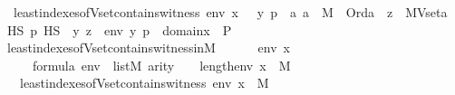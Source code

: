 \begin{isabellebody}
\ \ {\isachardoublequoteopen}least{\isacharunderscore}{\kern0pt}indexes{\isacharunderscore}{\kern0pt}of{\isacharunderscore}{\kern0pt}Vset{\isacharunderscore}{\kern0pt}contains{\isacharunderscore}{\kern0pt}witness{\isacharparenleft}{\kern0pt}{\isasymphi}{\isacharcomma}{\kern0pt}\ env{\isacharcomma}{\kern0pt}\ x{\isacharparenright}{\kern0pt}\ {\isasymequiv}\ {\isacharbraceleft}{\kern0pt}\ {\isacharless}{\kern0pt}{\isacharless}{\kern0pt}y{\isacharcomma}{\kern0pt}\ p{\isachargreater}{\kern0pt}{\isacharcomma}{\kern0pt}\ {\isacharparenleft}{\kern0pt}{\isasymmu}\ a{\isachardot}{\kern0pt}\ a\ {\isasymin}\ M\ {\isasymand}\ Ord{\isacharparenleft}{\kern0pt}a{\isacharparenright}{\kern0pt}\ {\isasymand}\ {\isacharparenleft}{\kern0pt}{\isasymexists}z\ {\isasymin}\ MVset{\isacharparenleft}{\kern0pt}a{\isacharparenright}{\kern0pt}\ {\isasyminter}\ HS{\isachardot}{\kern0pt}\ p\ {\isasymtturnstile}HS\ {\isasymphi}\ {\isacharparenleft}{\kern0pt}{\isacharbrackleft}{\kern0pt}y{\isacharcomma}{\kern0pt}\ z{\isacharbrackright}{\kern0pt}\ {\isacharat}{\kern0pt}\ env{\isacharparenright}{\kern0pt}{\isacharparenright}{\kern0pt}{\isacharparenright}{\kern0pt}{\isachargreater}{\kern0pt}{\isachardot}{\kern0pt}\ {\isacharless}{\kern0pt}y{\isacharcomma}{\kern0pt}\ p{\isachargreater}{\kern0pt}\ {\isasymin}\ domain{\isacharparenleft}{\kern0pt}x{\isacharparenright}{\kern0pt}\ {\isasymtimes}\ P\ {\isacharbraceright}{\kern0pt}{\isachardoublequoteclose}\isanewline
\isanewline
{}\isamarkupfalse%
\ least{\isacharunderscore}{\kern0pt}indexes{\isacharunderscore}{\kern0pt}of{\isacharunderscore}{\kern0pt}Vset{\isacharunderscore}{\kern0pt}contains{\isacharunderscore}{\kern0pt}witness{\isacharunderscore}{\kern0pt}in{\isacharunderscore}{\kern0pt}M\ {\isacharcolon}{\kern0pt}\ \isanewline
\ \ \ {\isasymphi}\ env\ x\ \isanewline
\ \ \ {\isachardoublequoteopen}{\isasymphi}\ {\isasymin}\ formula{\isachardoublequoteclose}\ {\isachardoublequoteopen}env\ {\isasymin}\ list{\isacharparenleft}{\kern0pt}M{\isacharparenright}{\kern0pt}{\isachardoublequoteclose}\ {\isachardoublequoteopen}arity{\isacharparenleft}{\kern0pt}{\isasymphi}{\isacharparenright}{\kern0pt}\ {\isasymle}\ {}\ {\isacharhash}{\kern0pt}{\isacharplus}{\kern0pt}\ length{\isacharparenleft}{\kern0pt}env{\isacharparenright}{\kern0pt}{\isachardoublequoteclose}\ {\isachardoublequoteopen}x\ {\isasymin}\ M{\isachardoublequoteclose}\ \isanewline
\ \ \ {\isachardoublequoteopen}least{\isacharunderscore}{\kern0pt}indexes{\isacharunderscore}{\kern0pt}of{\isacharunderscore}{\kern0pt}Vset{\isacharunderscore}{\kern0pt}contains{\isacharunderscore}{\kern0pt}witness{\isacharparenleft}{\kern0pt}{\isasymphi}{\isacharcomma}{\kern0pt}\ env{\isacharcomma}{\kern0pt}\ x{\isacharparenright}{\kern0pt}\ {\isasymin}\ M{\isachardoublequoteclose}\ \isanewline

\end{isabellebody}
